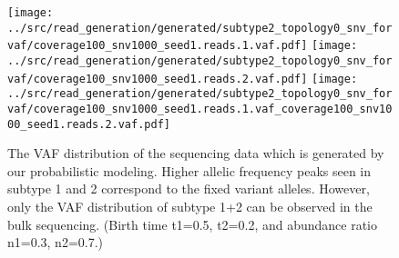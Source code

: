 \documentclass{article}
\begin{document}
\begin{figure}[H]
 \texttt{[image: ../src/read\_generation/generated/subtype2\_topology0\_snv\_forvaf/coverage100\_snv1000\_seed1.reads.1.vaf.pdf]}
 \texttt{[image: ../src/read\_generation/generated/subtype2\_topology0\_snv\_forvaf/coverage100\_snv1000\_seed1.reads.2.vaf.pdf]}
 \texttt{[image: ../src/read\_generation/generated/subtype2\_topology0\_snv\_forvaf/coverage100\_snv1000\_seed1.reads.1.vaf\_coverage100\_snv1000\_seed1.reads.2.vaf.pdf]}
 \caption{The VAF distribution of the sequencing data which is generated by our probabilistic modeling. Higher allelic frequency peaks seen in subtype 1 and 2 correspond to the fixed variant alleles. However, only the VAF distribution of subtype 1+2 can be observed in the bulk sequencing. (Birth time t1=0.5, t2=0.2, and abundance ratio n1=0.3,  n2=0.7.)}
 \label{VAF_distribution_generated}
\end{figure}
\end{document}

